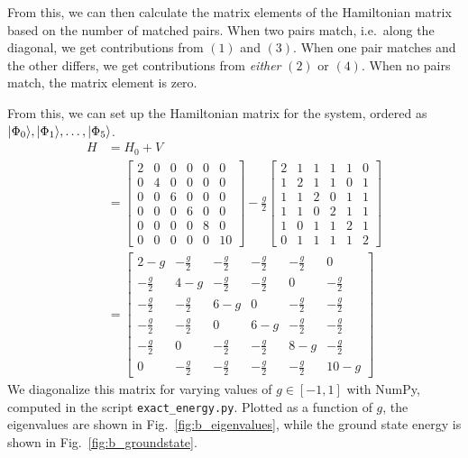 From this, we can then calculate the matrix elements of the Hamiltonian matrix based on the number of matched pairs.
When two pairs match, i.e.~along the diagonal, we get contributions from $(1)$ and $(3)$.
When one pair matches and the other differs, we get contributions from \textit{either} $(2)$ or $(4)$.
When no pairs match, the matrix element is zero.

From this, we can set up the Hamiltonian matrix for the system, ordered as $\lvert\Phi_0\rangle, \lvert\Phi_1\rangle, \ldots, \lvert\Phi_5\rangle$.
\begin{align*}
    H &= H_0 + V \\
    &=
    \begin{bmatrix}
        2 & 0 & 0 & 0 & 0 & 0 \\
        0 & 4 & 0 & 0 & 0 & 0 \\
        0 & 0 & 6 & 0 & 0 & 0 \\
        0 & 0 & 0 & 6 & 0 & 0 \\
        0 & 0 & 0 & 0 & 8 & 0 \\
        0 & 0 & 0 & 0 & 0 & 10
    \end{bmatrix}
    - \frac{g}{2}
    \begin{bmatrix}
        2 & 1 & 1 & 1 & 1 & 0 \\
        1 & 2 & 1 & 1 & 0 & 1 \\
        1 & 1 & 2 & 0 & 1 & 1 \\
        1 & 1 & 0 & 2 & 1 & 1 \\
        1 & 0 & 1 & 1 & 2 & 1 \\
        0 & 1 & 1 & 1 & 1 & 2
    \end{bmatrix} \\
    &=
    \begin{bmatrix}
        2 - g & - \frac{g}{2} & - \frac{g}{2} & - \frac{g}{2} & - \frac{g}{2} & 0 \\
        - \frac{g}{2} & 4 - g & - \frac{g}{2} & - \frac{g}{2} & 0 & - \frac{g}{2} \\
        - \frac{g}{2} & - \frac{g}{2} & 6 - g & 0 & - \frac{g}{2} & - \frac{g}{2} \\
        - \frac{g}{2} & - \frac{g}{2} & 0 & 6 - g & - \frac{g}{2} & - \frac{g}{2} \\
        - \frac{g}{2} & 0 & - \frac{g}{2} & - \frac{g}{2} & 8 - g & - \frac{g}{2} \\
        0 & - \frac{g}{2} & - \frac{g}{2} & - \frac{g}{2} & - \frac{g}{2} & 10 - g
    \end{bmatrix}
\end{align*}
We diagonalize this matrix for varying values of $g \in [-1, 1]$ with NumPy, computed in the script \verb|exact_energy.py|.
Plotted as a function of $g$, the eigenvalues are shown in Fig.~\ref{fig:b_eigenvalues}, while the ground state energy is shown in Fig.~\ref{fig:b_groundstate}.

